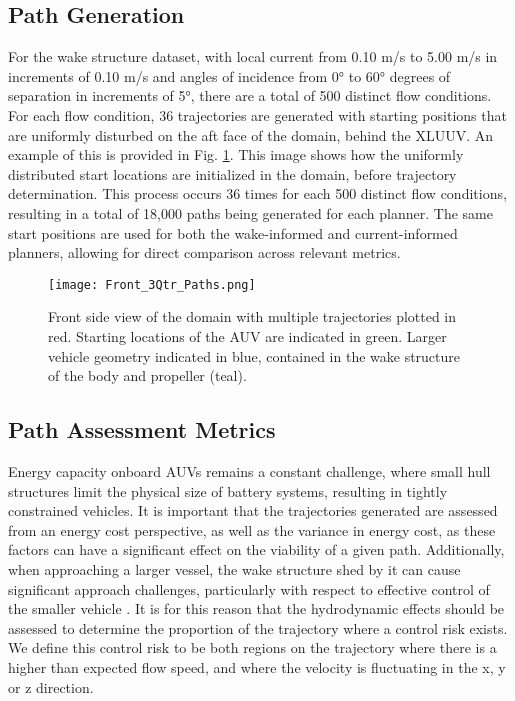 \documentclass[final,5p,times,twocolumn]{elsarticle}
\begin{document}
\subsection{Path Generation}
\label{Path Generation}

For the wake structure dataset, with local current from 0.10 m/s to 5.00 m/s in increments of 0.10 m/s and angles of incidence from 0° to 60° degrees of separation in increments of 5°, there are a total of 500 distinct flow conditions. For each flow condition, 36 trajectories are generated with starting positions that are uniformly disturbed on the aft face of the domain, behind the XLUUV. An example of this is provided in Fig. \ref{fig:DomainSidePaths}. This image shows how the uniformly distributed start locations are initialized in the domain, before trajectory determination. This process occurs 36 times for each 500 distinct flow conditions, resulting in a total of 18,000 paths being generated for each planner. The same start positions are used for both the wake-informed and current-informed planners, allowing for direct comparison across relevant metrics.

\begin{figure}[!htbp]
    \centering
    \texttt{[image: Front\_3Qtr\_Paths.png]}
    \caption{Front side view of the domain with multiple trajectories plotted in red. Starting locations of the AUV are indicated in green. Larger vehicle geometry indicated in blue, contained in the wake structure of the body and propeller (teal).}
    \label{fig:DomainSidePaths}
\end{figure}


\subsection{Path Assessment Metrics}
\label{Path Assessment Metrics}

Energy capacity onboard AUVs remains a constant challenge, where small hull structures limit the physical size of battery systems, resulting in tightly constrained vehicles. It is important that the trajectories generated are assessed from an energy cost perspective, as well as the variance in energy cost, as these factors can have a significant effect on the viability of a given path. Additionally, when approaching a larger vessel, the wake structure shed by it can cause significant approach challenges, particularly with respect to effective control of the smaller vehicle \cite{IEEE} \cite{SUBSTEC}. It is for this reason that the hydrodynamic effects should be assessed to determine the proportion of the trajectory where a control risk exists. We define this control risk to be both regions on the trajectory where there is a higher than expected flow speed, and where the velocity is fluctuating in the x, y or z direction. 
\end{document}
